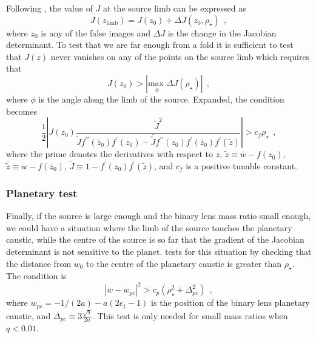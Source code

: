 \documentclass[12pt,dvipsnames]{report}
\newcommand{\hquad}{~~}
\begin{document}
Following \citet{2018MNRAS.479.5157B}, the value of $J$ at the source limb can be 
expressed as 
\begin{equation}
    J(z_\mathrm{limb})=J(z_0)+\Delta J(z_0,\rho_\star)
    \hquad,
\end{equation}
where $z_0$ is any of the false images and $\Delta J$ is the change in the Jacobian 
determinant.
To test that we are far enough from a fold it is sufficient to test that $J(z)$ never 
vanishes on any of the points on the source limb which requires that 
\citep[see][]{2018MNRAS.479.5157B}
\begin{equation}
    J(z_0)>|\underset{\phi}{\mathrm{max}\;}\Delta J(\rho_\star)|
    \hquad,
\end{equation}
where $\phi$ is the angle along the limb of the source.
Expanded, the condition becomes
\begin{equation}
\frac{1}{2}\left| J\left(z_0\right) \frac{\tilde{J}^{2}}{\tilde{J} 
f^{\prime \prime}\left(\bar{z}_0\right) f^{\prime}\left(z_0\right)-\bar{\tilde{J}} 
f^{\prime \prime}\left(z_0\right) f^{\prime}\left(\bar{z}_0\right) f^{\prime}
(\tilde{z})}\right|>c_f \rho_\star
\hquad,
\end{equation}
where the prime
 denotes the  derivatives with respect to $z$, $\tilde{z}\equiv \bar{w}-f(z_0)$, 
$\bar{\tilde{z}}\equiv w - f(\bar{z}_0)$, $\tilde{J}\equiv 1 - f^\prime(z_0)f^\prime(\tilde{z})$,
and $c_f$ is a positive tunable constant.

\subsubsection{Planetary test}
Finally, if the source is large enough and the binary lens mass ratio small enough, we 
could have a situation where the limb of the source touches the planetary caustic, while 
the centre of the source is so far that the gradient of the Jacobian determinant is not 
sensitive to the planet. \citet{2018MNRAS.479.5157B} tests for this situation by checking 
that the distance from $w_0$ to the centre of the planetary caustic is greater than $\rho_\star$. 
The condition is
\begin{equation}
\left|w-w_{p c}\right|^{2}>c_p\left(\rho_\star^{2}+\Delta_{p c}^{2}\right)
\hquad ,
\end{equation}
where $w_{pc}=-1/(2a)-a(2\epsilon_1 - 1)$ is the position of the binary lens planetary 
caustic, and $\Delta_{pc}\equiv 3\frac{\sqrt{q}}{2a}$. This test is only needed for small 
mass ratios when $q<0.01$. 
\end{document}
